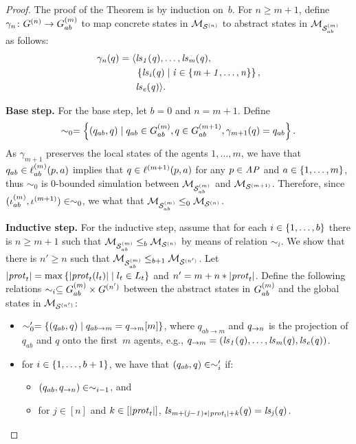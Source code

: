 \begin{proof}

The proof of the Theorem is by induction on~$b$. For $n \geq m+1$,  define
$\gamma_n \colon G^{(n)} \rightarrow G^{(m)}_{ab}$ to map concrete
states in $\mathcal{M}_{\mathcal{S}^{(n)}}$ to abstract states in $\mathcal{M}_{\mathcal{S}_{ab}^{(m)}}$ as follows:
\begin{align*}
  \gamma_n(q) =  \langle &\it{ls}_{1}(q), \ldots, \it{ls}_{m}(q), \\
  &\left \{ \it{ls}_{i}(q) \mid i \in \left \{ m + 1, \ldots, n \right \} \right \}, \\
  &\it{ls}_{e}(q)  \rangle.
\end{align*}

{\bf Base step.} For the base step, let $b = 0$ and $n = m+1$. Define $$\sim_0 =
\left \{ (q_{ab}, q) \mid q_{ab} \in G^{(m)}_{ab}, q \in
G^{(m+1)}_{ab}, \gamma_{m+1}(q) = q_{ab} \right \}.$$ As $\gamma_{m+1}$ preserves
the local states of the agents $1, \ldots, m$, we have that $q_{ab} \in
\ell^{(m)}_{ab}(p, a)$ implies that $q \in \ell^{(m+1)}(p, a)$ for any $p \in
\it{AP}$ and $a \in \left \{ 1, \ldots, m \right \}$, thus  $\sim_0$ is $0$-bounded
simulation between $\mathcal{M}_{\mathcal{S}_{ab}^{(m)}}$ and $\mathcal{M}_{\mathcal{S}^{(m+1)}}$. Therefore, since
$(\iota^{({m})}_{ab}, \iota^{({m+1})}) \in \sim_0$, we what that $\mathcal{M}_{\mathcal{S}_{ab}^{(m)}} \leq_0
\mathcal{M}_{\mathcal{S}^{(n)}}$. 

{\bf Inductive step.} For the inductive step, assume that for each $i \in
\left \{ 1, \ldots, b \right \}$ there is $n \geq m + 1$ such that $\mathcal{M}_{\mathcal{S}_{ab}^{(m)}} \leq_b \mathcal{M}_{\mathcal{S}^{(n)}}$
by means of relation $\sim_i$. We show that there is $n' \geq n$ such that
$\mathcal{M}_{\mathcal{S}_{ab}^{(m)}} \leq_{b+1} \mathcal{M}_{\mathcal{S}^{(n')}}$. Let $|\mathit{prot}_{t}| = \max \left \{ |\mathit{prot}_{t}(l_t)| \mid
l_t \in L_{t} \right \}$ and  $n' = m + n * |\mathit{prot}_{t}|$.  Define the following
relations $\sim_i \subseteq G^{(m)}_{ab} \times G^{(n')}$ between
the abstract states in $G^{(m)}_{ab}$ and the global states in $\mathcal{M}_{\mathcal{S}^{(n')}}$:

\begin{itemize}

  \item  $\sim'_0 = \left \{ (q_{ab}, q) \mid  q_{ab \rightarrow m} =
  q_{\rightarrow m} [m] \right \}$, where $q_{ab \rightarrow m}$ and $q_{\rightarrow n}$
  is the projection of $q_{ab}$ and $q$ onto the first~$m$ agents, e.g.,
  $q_{\rightarrow m} = \left ( \it{ls}_{1}(q), \ldots, \it{ls}_{m}(q), \it{ls}_{e}(q) \right )$.


  \item for $i \in \left \{ 1, \ldots, b + 1 \right \}$, we have that $(q_{ab}, q) \in
  \sim'_i$ if:
  \begin{itemize}
    \item  $(q_{ab},q_{\rightarrow n}) \in \sim_{i-1}$, and 
    \item  for $j \in [n]$ and $k \in [|\mathit{prot}_{t}|]$, 
    $\it{ls}_{m + (j - 1) * |\mathit{prot}_{t}| + k}(q) = \it{ls}_{j}(q)$.
  \end{itemize}
\end{itemize}


\end{proof}
